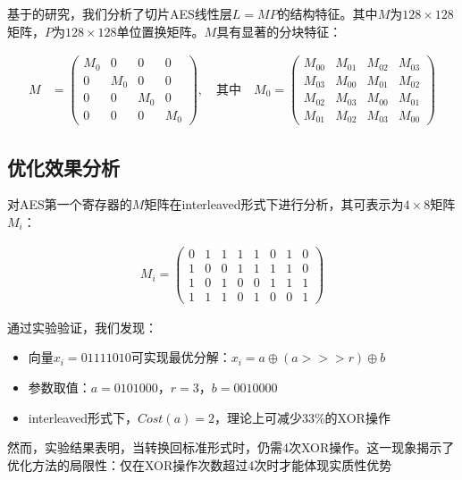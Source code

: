 \documentclass[11pt,a4paper]{article}
\newcommand{\ggg}{\mathrel{>\!\!>\!\!>}}
\begin{document}
基于\cite{Adomnicai2021}的研究，我们分析了切片AES线性层$L=MP$的结构特征。其中$M$为$128 \times 128$矩阵，$P$为$128 \times 128$单位置换矩阵。$M$具有显著的分块特征：

\begin{align}
M &= \begin{pmatrix}
    M_0 & 0 & 0 & 0 \\
    0 & M_0 & 0 & 0 \\
    0 & 0 & M_0 & 0 \\
    0 & 0 & 0 & M_0
\end{pmatrix}, \quad \text{其中} \quad
M_0 = \begin{pmatrix}
    M_{00} & M_{01} & M_{02} & M_{03} \\
    M_{03} & M_{00} & M_{01} & M_{02} \\
    M_{02} & M_{03} & M_{00} & M_{01} \\
    M_{01} & M_{02} & M_{03} & M_{00}
\end{pmatrix}
\end{align}

\subsection{优化效果分析}

对AES第一个寄存器的$M$矩阵在interleaved形式下进行分析，其可表示为$4\times8$矩阵$M_i$：

\begin{align}
M_i = \begin{pmatrix}
    0 & 1 & 1 & 1 & 1 & 0 & 1 & 0 \\
    1 & 0 & 0 & 1 & 1 & 1 & 1 & 0 \\
    1 & 0 & 1 & 0 & 0 & 1 & 1 & 1 \\
    1 & 1 & 1 & 0 & 1 & 0 & 0 & 1
\end{pmatrix}
\end{align}

通过实验验证，我们发现：

\begin{itemize}
\item 向量$x_i = 01111010$可实现最优分解：$x_i = a \oplus (a \ggg r) \oplus b$
\item 参数取值：$a = 0101000$，$r = 3$，$b = 0010000$
\item interleaved形式下，$Cost(a) = 2$，理论上可减少33\%的XOR操作
\end{itemize}

然而，实验结果表明，当转换回标准形式时，仍需4次XOR操作。这一现象揭示了\cite{Leurent2024}优化方法的局限性：仅在XOR操作次数超过4次时才能体现实质性优势
\end{document}
